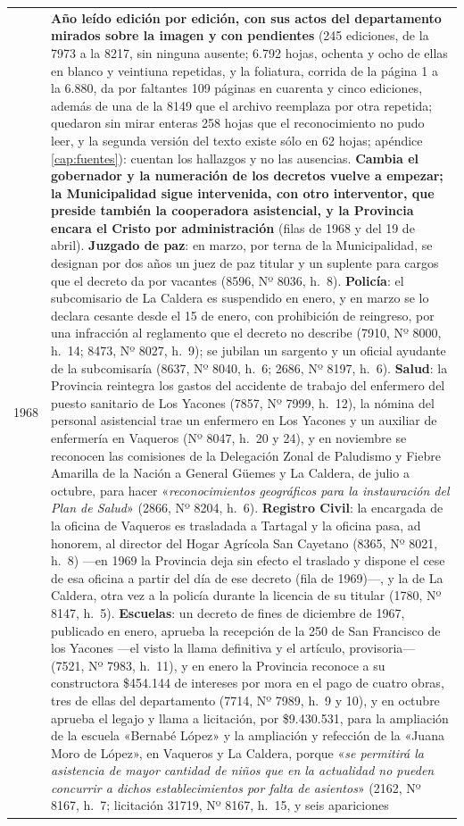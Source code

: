 \begin{longtable}{@{}p{2.7cm}p{10.3cm}@{}}
1968 & \textbf{Año leído edición por edición, con sus actos del departamento mirados sobre la imagen y con pendientes} (245 ediciones, de la 7973 a la 8217, sin ninguna ausente; 6.792 hojas, ochenta y ocho de ellas en blanco y veintiuna repetidas, y la foliatura, corrida de la página 1 a la 6.880, da por faltantes 109 páginas en cuarenta y cinco ediciones, además de una de la 8149 que el archivo reemplaza por otra repetida; quedaron sin mirar enteras 258 hojas que el reconocimiento no pudo leer, y la segunda versión del texto existe sólo en 62 hojas; apéndice \ref{cap:fuentes}): cuentan los hallazgos y no las ausencias. \textbf{Cambia el gobernador y la numeración de los decretos vuelve a empezar; la Municipalidad sigue intervenida, con otro interventor, que preside también la cooperadora asistencial, y la Provincia encara el Cristo por administración} (filas de 1968 y del 19 de abril). \textbf{Juzgado de paz}: en marzo, por terna de la Municipalidad, se designan por dos años un juez de paz titular y un suplente para cargos que el decreto da por vacantes (8596, Nº 8036, h.\ 8). \textbf{Policía}: el subcomisario de La Caldera es suspendido en enero, y en marzo se lo declara cesante desde el 15 de enero, con prohibición de reingreso, por una infracción al reglamento que el decreto no describe (7910, Nº 8000, h.\ 14; 8473, Nº 8027, h.\ 9); se jubilan un sargento y un oficial ayudante de la subcomisaría (8637, Nº 8040, h.\ 6; 2686, Nº 8197, h.\ 6). \textbf{Salud}: la Provincia reintegra los gastos del accidente de trabajo del enfermero del puesto sanitario de Los Yacones (7857, Nº 7999, h.\ 12), la nómina del personal asistencial trae un enfermero en Los Yacones y un auxiliar de enfermería en Vaqueros (Nº 8047, h.\ 20 y 24), y en noviembre se reconocen las comisiones de la Delegación Zonal de Paludismo y Fiebre Amarilla de la Nación a General Güemes y La Caldera, de julio a octubre, para hacer «\textit{reconocimientos geográficos para la instauración del Plan de Salud}» (2866, Nº 8204, h.\ 6). \textbf{Registro Civil}: la encargada de la oficina de Vaqueros es trasladada a Tartagal y la oficina pasa, ad honorem, al director del Hogar Agrícola San Cayetano (8365, Nº 8021, h.\ 8) ---en 1969 la Provincia deja sin efecto el traslado y dispone el cese de esa oficina a partir del día de ese decreto (fila de 1969)---, y la de La Caldera, otra vez a la policía durante la licencia de su titular (1780, Nº 8147, h.\ 5). \textbf{Escuelas}: un decreto de fines de diciembre de 1967, publicado en enero, aprueba la recepción de la 250 de San Francisco de los Yacones ---el visto la llama definitiva y el artículo, provisoria--- (7521, Nº 7983, h.\ 11), y en enero la Provincia reconoce a su constructora \$454.144 de intereses por mora en el pago de cuatro obras, tres de ellas del departamento (7714, Nº 7989, h.\ 9 y 10), y en octubre aprueba el legajo y llama a licitación, por \$9.430.531, para la ampliación de la escuela «Bernabé López» y la ampliación y refección de la «Juana Moro de López», en Vaqueros y La Caldera, porque «\textit{se permitirá la asistencia de mayor cantidad de niños que en la actualidad no pueden concurrir a dichos establecimientos por falta de asientos}» (2162, Nº 8167, h.\ 7; licitación 31719, Nº 8167, h.\ 15, y seis apariciones 
\end{longtable}
